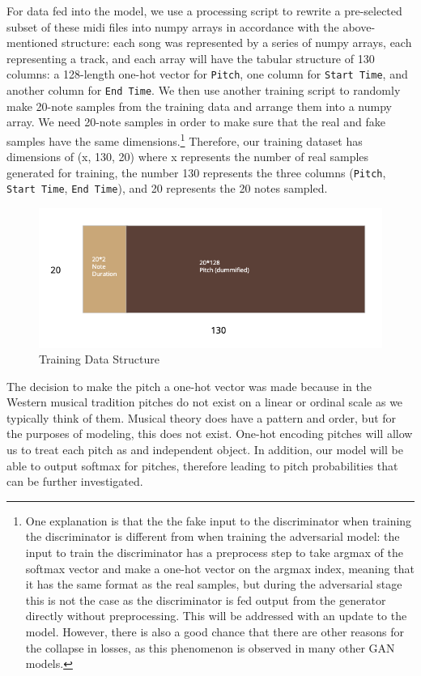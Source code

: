 \documentclass[12pt,oneside]{chicagocapstone}
\begin{document}
For data fed into the model, we use a processing script to rewrite a pre-selected subset of these midi files into numpy arrays in accordance with the above-mentioned structure: each song was represented by a series of numpy arrays, each representing a track, and each array will have the tabular structure of 130 columns: a 128-length one-hot vector for \texttt{Pitch}, one column for \texttt{Start\ Time}, and another column for \texttt{End\ Time}. We then use another training script to randomly make 20-note samples from the training data and arrange them into a numpy array. We need 20-note samples in order to make sure that the real and fake samples have the same dimensions.\footnote{One explanation is that the the fake input to the discriminator when training the discriminator is different from when training the adversarial model: the input to train the discriminator has a preprocess step to take argmax of the softmax vector and make a one-hot vector on the argmax index, meaning that it has the same format as the real samples, but during the adversarial stage this is not the case as the discriminator is fed output from the generator directly without preprocessing. This will be addressed with an update to the model. However, there is also a good chance that there are other reasons for the collapse in losses, as this phenomenon is observed in many other GAN models.} Therefore, our training dataset has dimensions of (x, 130, 20) where x represents the number of real samples generated for training, the number 130 represents the three columns (\texttt{Pitch}, \texttt{Start\ Time}, \texttt{End\ Time}), and 20 represents the 20 notes sampled.
\begin{figure}

{\centering \includegraphics[width=0.8\linewidth]{figure/training_data_structure} 

}

\caption{Training Data Structure}\label{fig:unnamed-chunk-3}
\end{figure}
The decision to make the pitch a one-hot vector was made because in the Western musical tradition pitches do not exist on a linear or ordinal scale as we typically think of them. Musical theory does have a pattern and order, but for the purposes of modeling, this does not exist. One-hot encoding pitches will allow us to treat each pitch as and independent object. In addition, our model will be able to output softmax for pitches, therefore leading to pitch probabilities that can be further investigated.
\end{document}
